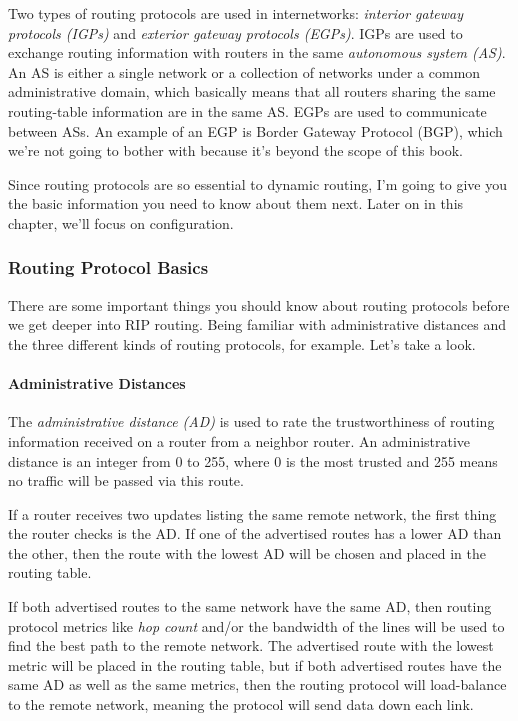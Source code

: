 Two types of routing protocols are used in internetworks: \emph{interior
gateway protocols (IGPs)} and \emph{exterior gateway protocols (EGPs)}.
IGPs are used to exchange routing information with routers in the same
\emph{autonomous system (AS)}. An AS is either a single network or a
collection of networks under a common administrative domain, which
basically means that all routers sharing the same routing-table
information are in the same AS. EGPs are used to communicate between
ASs. An example of an EGP is Border Gateway Protocol (BGP), which we're
not going to bother with because it's beyond the scope of this book.

Since routing protocols are so essential to dynamic routing, I'm going
to give you the basic information you need to know about them next.
Later on in this chapter, we'll focus on configuration.

\subsubsection[Routing Protocol
Basics]{\texorpdfstring{\protect\hypertarget{c09.xhtmlux5cux23c09-sec-13}{}{}Routing
Protocol Basics}{Routing Protocol Basics}}

There are some important things you should know about routing protocols
before we get deeper into RIP routing. Being familiar with
administrative distances and the three different kinds of routing
protocols, for example. Let's take a look.

\paragraph[Administrative
Distances]{\texorpdfstring{\protect\hypertarget{c09.xhtmlux5cux23Page_391}{}{}Administrative
Distances}{Administrative Distances}}

The \emph{administrative distance (AD)} is used to rate the
trustworthiness of routing information received on a router from a
neighbor router. An administrative distance is an integer from 0 to 255,
where 0 is the most trusted and 255 means no traffic will be passed via
this route.

If a router receives two updates listing the same remote network, the
first thing the router checks is the AD. If one of the advertised routes
has a lower AD than the other, then the route with the lowest AD will be
chosen and placed in the routing table.

If both advertised routes to the same network have the same AD, then
routing protocol metrics like \emph{hop count} and/or the bandwidth of
the lines will be used to find the best path to the remote network. The
advertised route with the lowest metric will be placed in the routing
table, but if both advertised routes have the same AD as well as the
same metrics, then the routing protocol will load-balance to the remote
network, meaning the protocol will send data down each link.

